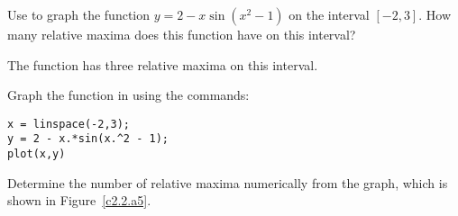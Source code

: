 \documentclass{ximera}
\begin{document}
\begin{exercise} \label{c2.2.a5}
Use \Matlab to graph the function $y = 2 - x\sin(x^2-1)$ on the interval
$[-2,3]$.  How many relative maxima does this function have on this interval?

\begin{solution}

\ans The function has three relative maxima on this interval.

\soln Graph the function in \Matlab using the commands:
\begin{verbatim}
x = linspace(-2,3);
y = 2 - x.*sin(x.^2 - 1);
plot(x,y)
\end{verbatim}
Determine the number of relative maxima numerically from the graph, which
is shown in Figure~\ref{c2.2.a5}.

\begin{figure}[htb]
                       \centerline{%
                       }
\end{figure}








\end{solution}
\end{exercise}
\end{document}
